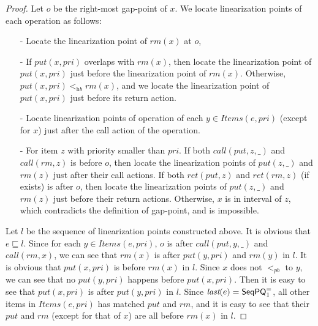 \begin {proof}

Let $o$ be the right-most gap-point of $x$. We locate linearization points of each operation as follows:

\begin{itemize}
\setlength{\itemsep}{0.5pt}
\item[-] Locate the linearization point of $\textit{rm}(x)$ at $o$,

\item[-] If $\textit{put}(x,\textit{pri})$ overlaps with $\textit{rm}(x)$, then locate the linearization point of $\textit{put}(x,\textit{pri})$ just before the linearization point of $\textit{rm}(x)$. Otherwise, $\textit{put}(x,\textit{pri}) <_{\textit{hb}} \textit{rm}(x)$, and we locate the linearization point of $\textit{put}(x,\textit{pri})$ just before its return action.

\item[-] Locate linearization points of operation of each $y \in \textit{Items}(e,\textit{pri})$ (except for $x$) just after the call action of the operation.

\item[-] For item $z$ with priority smaller than $\textit{pri}$. If both $\textit{call}(\textit{put},z,\_)$ and $\textit{call}(\textit{rm},z)$ is before $o$, then locate the linearization points of $\textit{put}(z,\_)$ and $\textit{rm}(z)$ just after their call actions. If both $\textit{ret}(\textit{put},z)$ and $\textit{ret}(\textit{rm},z)$ (if exists) is after $o$, then locate the linearization points of $\textit{put}(z,\_)$ and $\textit{rm}(z)$ just before their return actions. Otherwise, $x$ is in interval of $z$, which contradicts the definition of gap-point, and is impossible.
\end{itemize}

Let $l$ be the sequence of linearization points constructed above. It is obvious that $e \sqsubseteq l$. Since for each $y \in \textit{Items}(e,\textit{pri})$, $o$ is after $\textit{call}(\textit{put},y,\_)$ and $\textit{call}(\textit{rm},x)$, we can see that $\textit{rm}(x)$ is after $\textit{put}(y,\textit{pri})$ and $\textit{rm}(y)$ in $l$. It is obvious that $\textit{put}(x,\textit{pri})$ is before $\textit{rm}(x)$ in $l$. Since $x$ does not $<_{\textit{pb}}$ to $y$, we can see that no $\textit{put}(y,\textit{pri})$ happens before $\textit{put}(x,\textit{pri})$. Then it is easy to see that $\textit{put}(x,\textit{pri})$ is after $\textit{put}(y,\textit{pri})$ in $l$. Since $\textit{last}(e) = \mathsf{SeqPQ}_1^{=}$, all other items in $\textit{Items}(e,\textit{pri})$ has matched $\textit{put}$ and $\textit{rm}$, and it is easy to see that their $\textit{put}$ and $\textit{rm}$ (except for that of $x$) are all before $\textit{rm}(x)$ in $l$.


\end{proof}
